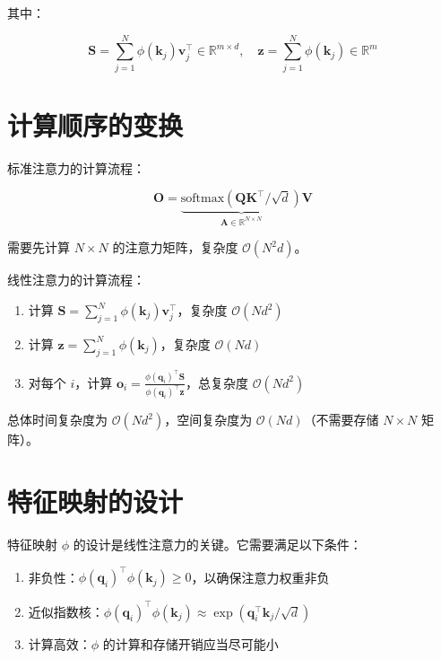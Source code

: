 其中：

\begin{equation}
    \mathbf{S} = \sum_{j=1}^N \phi(\mathbf{k}_j) \mathbf{v}_j^\top \in \mathbb{R}^{m \times d}, \quad \mathbf{z} = \sum_{j=1}^N \phi(\mathbf{k}_j) \in \mathbb{R}^m
\end{equation}

\section{计算顺序的变换}

标准注意力的计算流程：

\begin{equation}
    \mathbf{O} = \underbrace{\text{softmax}(\mathbf{Q}\mathbf{K}^\top/\sqrt{d})}_{\mathbf{A} \in \mathbb{R}^{N \times N}} \mathbf{V}
\end{equation}

需要先计算 $N \times N$ 的注意力矩阵，复杂度 $\mathcal{O}(N^2 d)$。

线性注意力的计算流程：

\begin{enumerate}
    \item 计算 $\mathbf{S} = \sum_{j=1}^N \phi(\mathbf{k}_j) \mathbf{v}_j^\top$，复杂度 $\mathcal{O}(Nd^2)$
    \item 计算 $\mathbf{z} = \sum_{j=1}^N \phi(\mathbf{k}_j)$，复杂度 $\mathcal{O}(Nd)$
    \item 对每个 $i$，计算 $\mathbf{o}_i = \frac{\phi(\mathbf{q}_i)^\top \mathbf{S}}{\phi(\mathbf{q}_i)^\top \mathbf{z}}$，总复杂度 $\mathcal{O}(Nd^2)$
\end{enumerate}

总体时间复杂度为 $\mathcal{O}(Nd^2)$，空间复杂度为 $\mathcal{O}(Nd)$（不需要存储 $N \times N$ 矩阵）。

\section{特征映射的设计}

特征映射 $\phi$ 的设计是线性注意力的关键。它需要满足以下条件：

\begin{enumerate}
    \item 非负性：$\phi(\mathbf{q}_i)^\top \phi(\mathbf{k}_j) \geq 0$，以确保注意力权重非负
    \item 近似指数核：$\phi(\mathbf{q}_i)^\top \phi(\mathbf{k}_j) \approx \exp(\mathbf{q}_i^\top \mathbf{k}_j / \sqrt{d})$
    \item 计算高效：$\phi$ 的计算和存储开销应当尽可能小
\end{enumerate}

